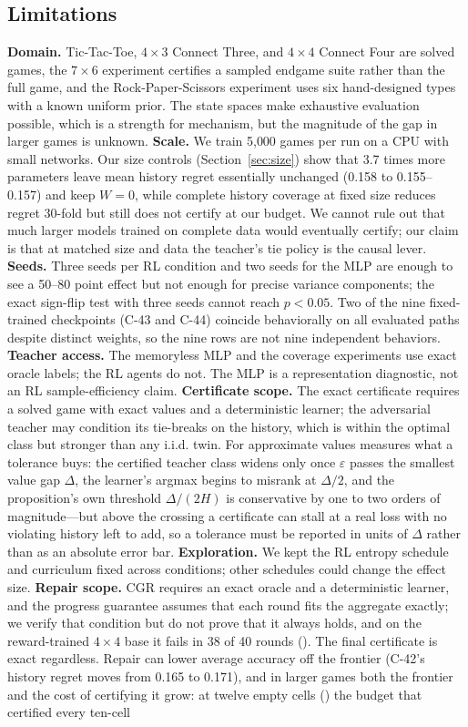 \documentclass[conference]{IEEEtran}
\begin{document}
\subsection{Limitations}
\textbf{Domain.} Tic-Tac-Toe, $4\times3$ Connect Three, and $4\times4$ Connect Four are solved games, the $7\times6$ experiment certifies a sampled endgame suite rather than the full game, and the Rock-Paper-Scissors experiment uses six hand-designed types with a known uniform prior. The state spaces make exhaustive evaluation possible, which is a strength for mechanism, but the magnitude of the gap in larger games is unknown. \textbf{Scale.} We train 5{,}000 games per run on a CPU with small networks. Our size controls (Section~\ref{sec:size}) show that 3.7 times more parameters leave mean history regret essentially unchanged (0.158 to 0.155--0.157) and keep $W=0$, while complete history coverage at fixed size reduces regret 30-fold but still does not certify at our budget. We cannot rule out that much larger models trained on complete data would eventually certify; our claim is that at matched size and data the teacher's tie policy is the causal lever. \textbf{Seeds.} Three seeds per RL condition and two seeds for the MLP are enough to see a 50--80 point effect but not enough for precise variance components; the exact sign-flip test with three seeds cannot reach $p<0.05$. Two of the nine fixed-trained checkpoints (C-43 and C-44) coincide behaviorally on all evaluated paths despite distinct weights, so the nine rows are not nine independent behaviors. \textbf{Teacher access.} The memoryless MLP and the coverage experiments use exact oracle labels; the RL agents do not. The MLP is a representation diagnostic, not an RL sample-efficiency claim. \textbf{Certificate scope.} The exact certificate requires a solved game with exact values and a deterministic learner; the adversarial teacher may condition its tie-breaks on the history, which is within the optimal class but stronger than any i.i.d. twin. For approximate values  measures what a tolerance buys: the certified teacher class widens only once $\varepsilon$ passes the smallest value gap $\Delta$, the learner's argmax begins to misrank at $\Delta/2$, and the proposition's own threshold $\Delta/(2H)$ is conservative by one to two orders of magnitude---but above the crossing a certificate can stall at a real loss with no violating history left to add, so a tolerance must be reported in units of $\Delta$ rather than as an absolute error bar. \textbf{Exploration.} We kept the RL entropy schedule and curriculum fixed across conditions; other schedules could change the effect size. \textbf{Repair scope.} CGR requires an exact oracle and a deterministic learner, and the progress guarantee assumes that each round fits the aggregate exactly; we verify that condition but do not prove that it always holds, and on the reward-trained $4\times4$ base it fails in 38 of 40 rounds (). The final certificate is exact regardless. Repair can lower average accuracy off the frontier (C-42's history regret moves from 0.165 to 0.171), and in larger games both the frontier and the cost of certifying it grow: at twelve empty cells () the budget that certified every ten-cell 
\end{document}
